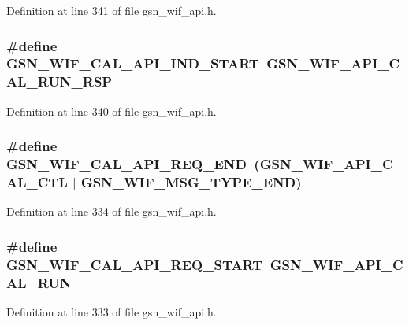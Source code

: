 Definition at line 341 of file gsn\_\-wif\_\-api.h.

\hypertarget{a00606_a59025d140d6b62b1af0e733dea2bbdd6}{
\subsubsection[{GSN\_\-WIF\_\-CAL\_\-API\_\-IND\_\-START}]{\setlength{\rightskip}{0pt plus 5cm}\#define GSN\_\-WIF\_\-CAL\_\-API\_\-IND\_\-START~GSN\_\-WIF\_\-API\_\-CAL\_\-RUN\_\-RSP}}
\label{a00606_a59025d140d6b62b1af0e733dea2bbdd6}


Definition at line 340 of file gsn\_\-wif\_\-api.h.

\hypertarget{a00606_a3ecbea43eead2908ddcc145a26ce4b91}{
\subsubsection[{GSN\_\-WIF\_\-CAL\_\-API\_\-REQ\_\-END}]{\setlength{\rightskip}{0pt plus 5cm}\#define GSN\_\-WIF\_\-CAL\_\-API\_\-REQ\_\-END~(GSN\_\-WIF\_\-API\_\-CAL\_\-CTL $|$ GSN\_\-WIF\_\-MSG\_\-TYPE\_\-END)}}
\label{a00606_a3ecbea43eead2908ddcc145a26ce4b91}


Definition at line 334 of file gsn\_\-wif\_\-api.h.

\hypertarget{a00606_ae8235399bcb09b9515e753a961d47f1c}{
\subsubsection[{GSN\_\-WIF\_\-CAL\_\-API\_\-REQ\_\-START}]{\setlength{\rightskip}{0pt plus 5cm}\#define GSN\_\-WIF\_\-CAL\_\-API\_\-REQ\_\-START~GSN\_\-WIF\_\-API\_\-CAL\_\-RUN}}
\label{a00606_ae8235399bcb09b9515e753a961d47f1c}


Definition at line 333 of file gsn\_\-wif\_\-api.h.

